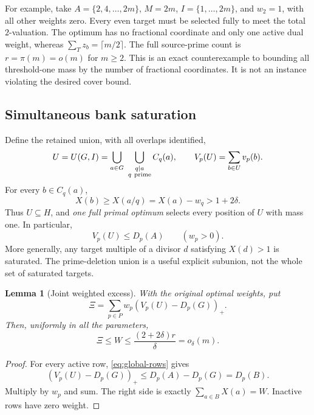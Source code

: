 \documentclass[11pt,a4paper]{article}
\newtheorem{lemma}[theorem]{Lemma}
\theoremstyle{remark}
\newcommand{\pos}[1]{(#1)_+}
\begin{document}
For example, take \(A=\{2,4,\ldots,2m\}\), \(M=2m\),
\(I=\{1,\ldots,2m\}\), and \(w_2=1\), with all other weights zero.
Every even target must be selected fully to meet the total
\(2\)-valuation. The optimum has no fractional coordinate and only
one active dual weight, whereas
\(\sum_Tz_b=\lceil m/2\rceil\). The full source-prime count is
\(r=\pi(m)=o(m)\) for \(m\ge2\). This is an exact counterexample to
bounding all threshold-one mass by the number of fractional
coordinates. It is not an instance violating the desired cover bound.

\subsection{Simultaneous bank saturation}

Define the retained union, with all overlaps identified,
\begin{equation}
 U=U(G,I)=\bigcup_{a\in G}\ \bigcup_{\substack{q\mid a\\q\ {\rm prime}}}
                  C_q(a),\qquad
 V_p(U)=\sum_{b\in U}v_p(b).
 \label{eq:union}
\end{equation}
For every \(b\in C_q(a)\),
\[
 X(b)\ge X(a/q)=X(a)-w_q>1+2\delta.
\]
Thus \(U\subseteq H\), and \emph{one full primal optimum} selects
every position of \(U\) with mass one. In particular,
\begin{equation}
 V_p(U)\le D_p(A)\qquad(w_p>0).
 \label{eq:global-rows}
\end{equation}
More generally, any target multiple of a divisor \(d\) satisfying
\(X(d)>1\) is saturated. The prime-deletion union is a useful
explicit subunion, not the whole set of saturated targets.

\begin{lemma}[Joint weighted excess]
\label{lem:excess}
With the original optimal weights, put
\begin{equation}
 \Xi=\sum_{p\in P}w_p\pos{V_p(U)-D_p(G)}.
 \label{eq:Xi}
\end{equation}
Then, uniformly in all the parameters,
\begin{equation}
 \Xi\le W\le\frac{(2+2\delta)r}{\delta}=o_\delta(m).
 \label{eq:Xi-small}
\end{equation}
\end{lemma}

\begin{proof}
For every active row, \eqref{eq:global-rows} gives
\[
 \pos{V_p(U)-D_p(G)}
 \le D_p(A)-D_p(G)=D_p(B).
\]
Multiply by \(w_p\) and sum. The right side is exactly
\(\sum_{a\in B}X(a)=W\). Inactive rows have zero weight.
\end{proof}
\end{document}
